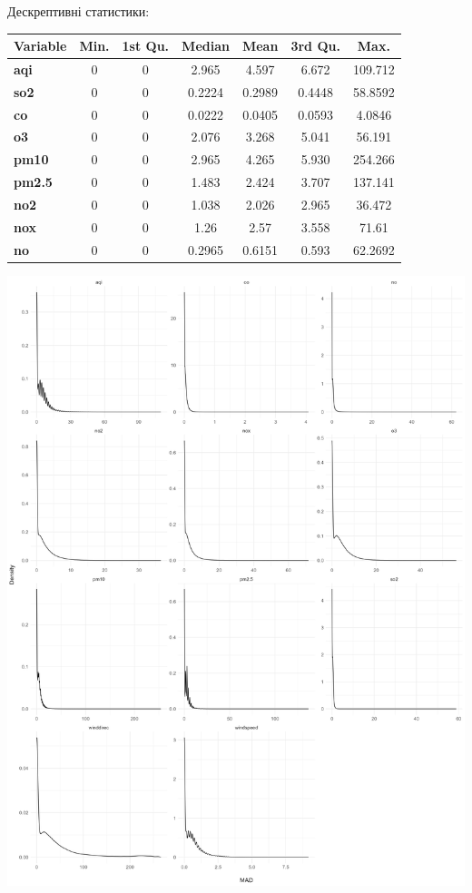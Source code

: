 \documentclass[./report.tex]{subfiles}
\begin{document}
\begin{enumerate}
  \pagebreak

  Дескрептивні статистики:

  \begin{tabular}{lcccccc}
    \hline
    \textbf{Variable} & \textbf{Min.} & \textbf{1st Qu.}  & \textbf{Median} & \textbf{Mean} & \textbf{3rd Qu.} & \textbf{Max.} \\
    \hline
    \textbf{aqi}      & 0 & 0 & 2.965  & 4.597  & 6.672  & 109.712 \\
    \textbf{so2}      & 0 & 0 & 0.2224 & 0.2989 & 0.4448 & 58.8592 \\
    \textbf{co}       & 0 & 0 & 0.0222 & 0.0405 & 0.0593 & 4.0846  \\
    \textbf{o3}       & 0 & 0 & 2.076  & 3.268  & 5.041  & 56.191  \\
    \textbf{pm10}     & 0 & 0 & 2.965  & 4.265  & 5.930  & 254.266 \\
    \textbf{pm2.5}    & 0 & 0 & 1.483  & 2.424  & 3.707  & 137.141 \\
    \textbf{no2}      & 0 & 0 & 1.038  & 2.026  & 2.965  & 36.472  \\
    \textbf{nox}      & 0 & 0 & 1.26   & 2.57   & 3.558  & 71.61   \\
    \textbf{no}       & 0 & 0 & 0.2965 & 0.6151 & 0.593  & 62.2692 \\
  \end{tabular}

  \includegraphics[width=\linewidth]{plots/question7/density.png}


\end{enumerate}
\end{document}
